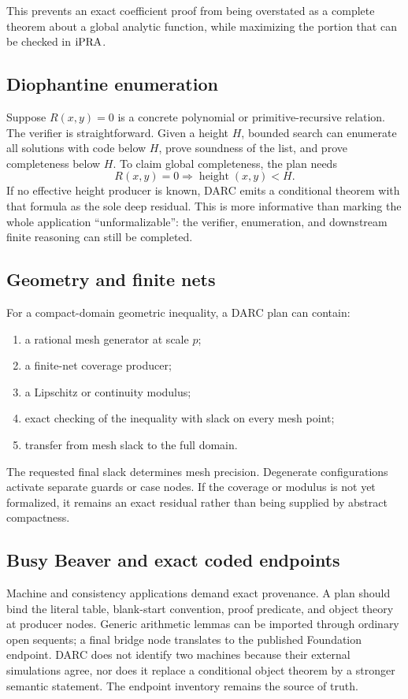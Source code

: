 This prevents an exact coefficient proof from being overstated as a complete
theorem about a global analytic function, while maximizing the portion that
can be checked in \(\mathrm{iPRA}\).

\subsection{Diophantine enumeration}

Suppose \(R(x,y)=0\) is a concrete polynomial or primitive-recursive relation.
The verifier is straightforward.  Given a height \(H\), bounded search can
enumerate all solutions with code below \(H\), prove soundness of the list, and
prove completeness below \(H\).  To claim global completeness, the plan needs
\[
  R(x,y)=0\Longrightarrow \operatorname{height}(x,y)<H.
\]
If no effective height producer is known, DARC emits a conditional theorem
with that formula as the sole deep residual.  This is more informative than
marking the whole application ``unformalizable'': the verifier, enumeration,
and downstream finite reasoning can still be completed.

\subsection{Geometry and finite nets}

For a compact-domain geometric inequality, a DARC plan can contain:
\begin{enumerate}
  \item a rational mesh generator at scale \(p\);
  \item a finite-net coverage producer;
  \item a Lipschitz or continuity modulus;
  \item exact checking of the inequality with slack on every mesh point;
  \item transfer from mesh slack to the full domain.
\end{enumerate}
The requested final slack determines mesh precision.  Degenerate configurations
activate separate guards or case nodes.  If the coverage or modulus is not yet
formalized, it remains an exact residual rather than being supplied by
abstract compactness.

\subsection{Busy Beaver and exact coded endpoints}

Machine and consistency applications demand exact provenance.  A plan should
bind the literal table, blank-start convention, proof predicate, and object
theory at producer nodes.  Generic arithmetic lemmas can be imported through
ordinary open sequents; a final bridge node translates to the published
Foundation endpoint.  DARC does not identify two machines because their
external simulations agree, nor does it replace a conditional object theorem
by a stronger semantic statement.  The endpoint inventory remains the source
of truth.

